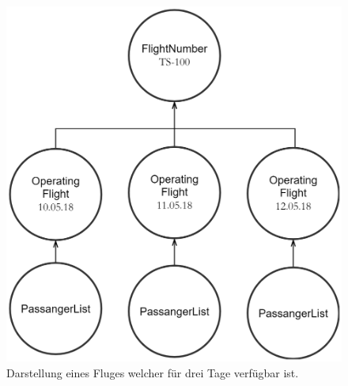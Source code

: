 \begin{figure}
  \centering
  \includegraphics[width=0.65\linewidth]{gfx/implementation/FlightNumberSample}
  \caption{Darstellung eines Fluges welcher für drei Tage verfügbar ist.}
  \label{fig:implementation:entityFlightNumber}
\end{figure} 

